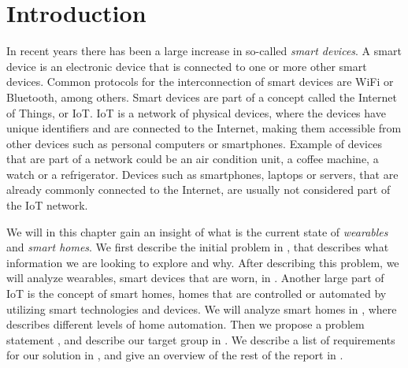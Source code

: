 \chapter{Introduction}\label{chap:introduction}
In recent years there has been a large increase in so-called \emph{smart devices}. 
A smart device is an electronic device that is connected to one or more other smart devices. 
Common protocols for the interconnection of smart devices are WiFi or Bluetooth, among others.
Smart devices are part of a concept called the Internet of Things, or IoT. 
IoT is a network of physical devices, 
where the devices have unique identifiers and are connected to the Internet, 
making them accessible from other devices such as personal computers or smartphones. 
Example of devices that are part of a network could be an air condition unit, a coffee machine, a watch or a refrigerator. 
Devices such as smartphones, laptops or servers, 
that are already commonly connected to the Internet, 
are usually not considered part of the IoT network. 

We will in this chapter gain an insight of what is the current state of \emph{wearables} and \emph{smart homes}. 
We first describe the initial problem in , 
that describes what information we are looking to explore and why. 
After describing this problem, we will analyze wearables, 
\ie smart devices that are worn, in .
Another large part of IoT is the concept of smart homes, 
\ie homes that are controlled or automated by utilizing smart technologies and devices. 
We will analyze smart homes in , 
where  describes different levels of home automation. 
Then we propose a problem statement , 
and describe our target group in .
We describe a list of requirements for our solution in ,
and give an overview of the rest of the report in .










